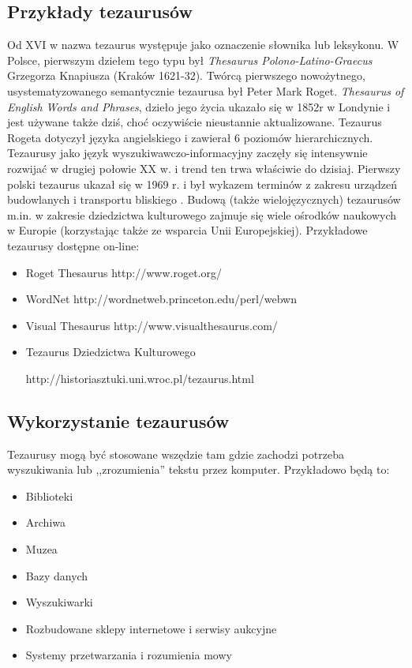 \subsection{Przykłady tezaurusów}
Od XVI w nazwa tezaurus występuje jako oznaczenie słownika lub leksykonu. W Polsce, pierwszym dziełem tego typu był \textit{ Thesaurus Polono-Latino-Graecus} Grzegorza Knapiusza (Kraków 1621-32). Twórcą pierwszego nowożytnego, usystematyzowanego semantycznie tezaurusa był Peter Mark Roget. \textit{Thesaurus of English Words and Phrases}, dzieło jego życia ukazało się w 1852r w Londynie i jest używane także dziś, choć oczywiście nieustannie aktualizowane. Tezaurus Rogeta dotyczył języka angielskiego i zawierał 6 poziomów hierarchicznych. Tezaurusy jako język wyszukiwawczo-informacyjny zaczęły się intensywnie rozwijać w drugiej połowie XX w. i trend ten trwa właściwie do dzisiaj. Pierwszy polski tezaurus ukazał się w 1969 r. i był wykazem terminów z zakresu urządzeń budowlanych i transportu bliskiego \cite{Sosinska}. Budową (także wielojęzycznych) tezaurusów m.in. w zakresie dziedzictwa kulturowego zajmuje się wiele ośrodków naukowych w Europie (korzystając także ze wsparcia Unii Europejskiej).
Przykładowe tezaurusy dostępne on-line:
\begin{itemize}
    \item Roget Thesaurus http://www.roget.org/
	\item WordNet http://wordnetweb.princeton.edu/perl/webwn
	\item Visual Thesaurus http://www.visualthesaurus.com/
	\item Tezaurus Dziedzictwa Kulturowego 

http://historiasztuki.uni.wroc.pl/tezaurus.html
\end{itemize}  

\subsection{Wykorzystanie tezaurusów}
Tezaurusy mogą być stosowane wszędzie tam gdzie zachodzi potrzeba wyszukiwania lub ,,zrozumienia'' tekstu przez komputer. Przykładowo będą to: 
\begin{itemize}
   \item Biblioteki
	\item Archiwa
	\item Muzea
	\item Bazy danych
	\item Wyszukiwarki
	\item Rozbudowane sklepy internetowe i serwisy aukcyjne
	\item Systemy przetwarzania i rozumienia mowy
\end{itemize}
